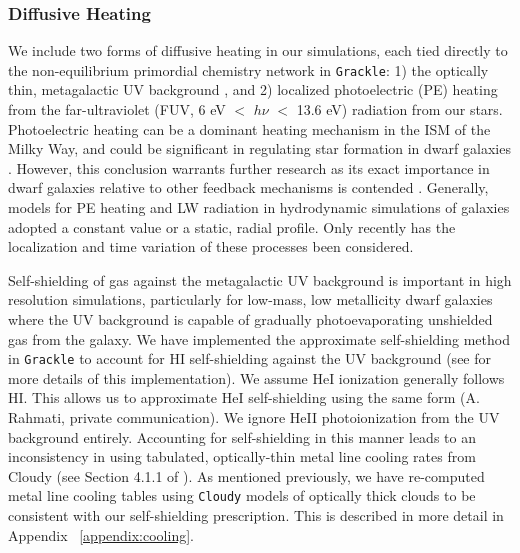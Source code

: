 \documentclass[twocolumn]{aastex61}
\begin{document}
\subsubsection{Diffusive Heating}
\label{sec:diffusive heating}
We include two forms of diffusive heating in our simulations, each tied directly to the non-equilibrium primordial chemistry network in \texttt{Grackle}: 1) the optically thin, metagalactic UV background \cite{HM2012}, and 2) localized photoelectric (PE) heating from the far-ultraviolet (FUV, 6 eV $<$ $h\nu$ $<$ 13.6 eV) radiation from our stars. Photoelectric heating can be a dominant heating mechanism in the ISM \citep{Parravano2003} of the Milky Way, and could be significant in regulating star formation in dwarf galaxies \citep{Forbes2016}. However, this conclusion warrants further research as its exact importance in dwarf galaxies relative to other feedback mechanisms is contended \citep{Hu2016,Hu2017}. Generally, models for PE heating and LW radiation in hydrodynamic simulations of galaxies adopted a constant value or a static, radial profile. Only recently has the localization and time variation of these processes been considered.

Self-shielding of gas against the metagalactic UV background is important in high resolution simulations, particularly for low-mass, low metallicity dwarf galaxies where the UV background is capable of gradually photoevaporating unshielded gas from the galaxy. We have implemented the \cite{Rahmati2013} approximate self-shielding method in \texttt{Grackle} to account for HI self-shielding against the UV background (see \citep{GrackleMethod} for more details of this implementation). We assume HeI ionization generally follows HI. This allows us to approximate HeI self-shielding using the same form (A. Rahmati, private communication). We ignore HeII photoionization from the UV background entirely. Accounting for self-shielding in this manner leads to an inconsistency in using tabulated, optically-thin metal line cooling rates from Cloudy (see Section 4.1.1 of \cite{Hu2017}). As mentioned previously, we have re-computed metal line cooling tables using \texttt{Cloudy} models of optically thick clouds to be consistent with our self-shielding prescription. This is described in more detail in Appendix ~\ref{appendix:cooling}. 

\end{document}
